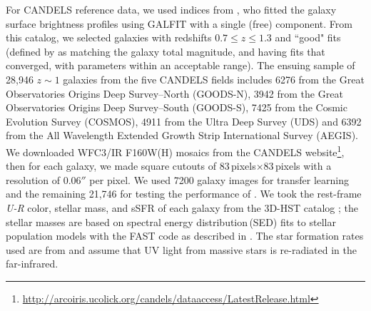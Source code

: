For CANDELS reference data, we used \sersic{} indices from \citet{vdw_12}, who fitted the galaxy surface brightness profiles using GALFIT \citep{galfit} with a single (free) \sersic{} component. From this catalog, we selected galaxies with redshifts $0.7 \leq z \leq 1.3$ and ``good" fits (defined by \citealp{vdw_12} as matching the galaxy total magnitude, and having fits that converged, with parameters within an acceptable range). The ensuing sample of 28,946 $z\sim1$ galaxies from the five CANDELS fields includes 6276 from the Great Observatories Origins Deep Survey--North (GOODS-N), 3942 from the Great Observatories Origins Deep Survey--South (GOODS-S), 7425 from the Cosmic Evolution Survey (COSMOS), 4911 from the Ultra Deep Survey (UDS) and 6392 from the All Wavelength Extended Growth Strip International Survey (AEGIS). We downloaded WFC3/IR F160W(H) mosaics from the CANDELS website\footnote{\href{http://arcoiris.ucolick.org/candels/data\textunderscore access/Latest\textunderscore Release.html}{http://arcoiris.ucolick.org/candels/data\textunderscore access/Latest\textunderscore Release.html}}, then for each galaxy, we made square cutouts of $83$\,pixels$\times83$\,pixels with a resolution of $0.06''$ per pixel. We used 7200 galaxy images for transfer learning and the remaining 21,746 for testing the performance of \gamornet{}. We took the rest-frame \textit{U-R} color, stellar mass, and sSFR of each galaxy from the 3D-HST catalog \citep{3dhst}; the stellar masses are based on spectral energy distribution\,(SED) fits to stellar population models with the FAST code \citep{fast} as described in \citet{skelton_14}. The star formation rates used are from \cite{whitaker_14} and assume that UV light from massive stars is re-radiated in the far-infrared.


